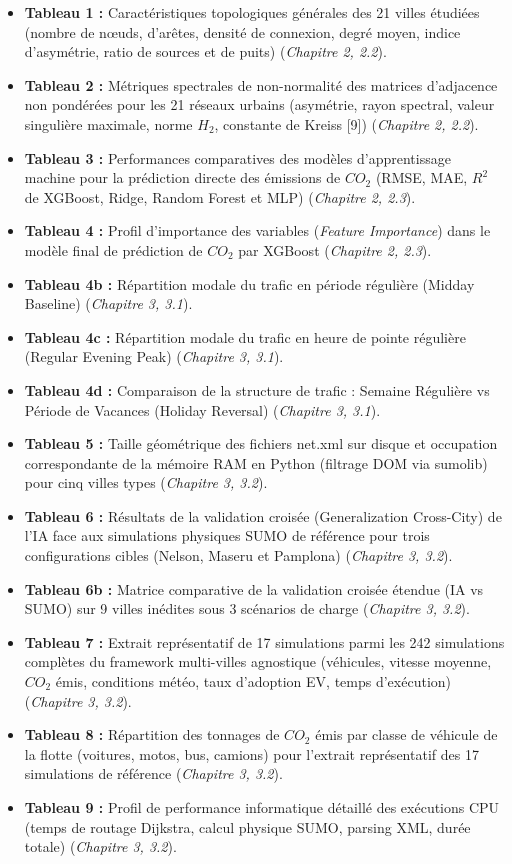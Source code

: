 \documentclass[10pt, a4paper]{article}
\providecommand{\tightlist}{}
\begin{document}
\begin{itemize}
\tightlist
\item
  \textbf{Tableau 1 :} Caractéristiques topologiques générales des 21
  villes étudiées (nombre de nœuds, d'arêtes, densité de connexion,
  degré moyen, indice d'asymétrie, ratio de sources et de puits)
  (\emph{Chapitre 2, 2.2}).
\item
  \textbf{Tableau 2 :} Métriques spectrales de non-normalité des
  matrices d'adjacence non pondérées pour les 21 réseaux urbains
  (asymétrie, rayon spectral, valeur singulière maximale, norme \(H_2\),
  constante de Kreiss {[}9{]}) (\emph{Chapitre 2, 2.2}).
\item
  \textbf{Tableau 3 :} Performances comparatives des modèles
  d'apprentissage machine pour la prédiction directe des émissions de
  \(CO_2\) (RMSE, MAE, \(R^2\) de XGBoost, Ridge, Random Forest et MLP)
  (\emph{Chapitre 2, 2.3}).
\item
  \textbf{Tableau 4 :} Profil d'importance des variables (\emph{Feature
  Importance}) dans le modèle final de prédiction de \(CO_2\) par
  XGBoost (\emph{Chapitre 2, 2.3}).
\item
  \textbf{Tableau 4b :} Répartition modale du trafic en période
  régulière (Midday Baseline) (\emph{Chapitre 3, 3.1}).
\item
  \textbf{Tableau 4c :} Répartition modale du trafic en heure de pointe
  régulière (Regular Evening Peak) (\emph{Chapitre 3, 3.1}).
\item
  \textbf{Tableau 4d :} Comparaison de la structure de trafic : Semaine
  Régulière vs Période de Vacances (Holiday Reversal) (\emph{Chapitre 3,
  3.1}).
\item
  \textbf{Tableau 5 :} Taille géométrique des fichiers net.xml sur
  disque et occupation correspondante de la mémoire RAM en Python
  (filtrage DOM via sumolib) pour cinq villes types (\emph{Chapitre 3,
  3.2}).
\item
  \textbf{Tableau 6 :} Résultats de la validation croisée
  (Generalization Cross-City) de l'IA face aux simulations physiques
  SUMO de référence pour trois configurations cibles (Nelson, Maseru et
  Pamplona) (\emph{Chapitre 3, 3.2}).
\item
  \textbf{Tableau 6b :} Matrice comparative de la validation croisée
  étendue (IA vs SUMO) sur 9 villes inédites sous 3 scénarios de charge
  (\emph{Chapitre 3, 3.2}).
\item
  \textbf{Tableau 7 :} Extrait représentatif de 17 simulations parmi les
  242 simulations complètes du framework multi-villes agnostique
  (véhicules, vitesse moyenne, \(CO_2\) émis, conditions météo, taux
  d'adoption EV, temps d'exécution) (\emph{Chapitre 3, 3.2}).
\item
  \textbf{Tableau 8 :} Répartition des tonnages de \(CO_2\) émis par
  classe de véhicule de la flotte (voitures, motos, bus, camions) pour
  l'extrait représentatif des 17 simulations de référence
  (\emph{Chapitre 3, 3.2}).
\item
  \textbf{Tableau 9 :} Profil de performance informatique détaillé des
  exécutions CPU (temps de routage Dijkstra, calcul physique SUMO,
  parsing XML, durée totale) (\emph{Chapitre 3, 3.2}).
\end{itemize}
\end{document}
